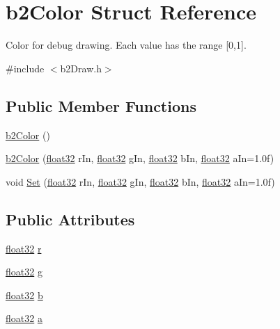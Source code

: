 \hypertarget{structb2_color}{}\section{b2\+Color Struct Reference}
\label{structb2_color}


Color for debug drawing. Each value has the range \mbox{[}0,1\mbox{]}.  




{\ttfamily \#include $<$b2\+Draw.\+h$>$}

\subsection*{Public Member Functions}
\begin{DoxyCompactItemize}
\item 
\mbox{\hyperlink{structb2_color_aab8716defcdf745729d1164cd8b08437}{b2\+Color}} ()
\item 
\mbox{\hyperlink{structb2_color_a7cceec6dae0dccd757f35eacd41595c6}{b2\+Color}} (\mbox{\hyperlink{b2_settings_8h_aacdc525d6f7bddb3ae95d5c311bd06a1}{float32}} r\+In, \mbox{\hyperlink{b2_settings_8h_aacdc525d6f7bddb3ae95d5c311bd06a1}{float32}} g\+In, \mbox{\hyperlink{b2_settings_8h_aacdc525d6f7bddb3ae95d5c311bd06a1}{float32}} b\+In, \mbox{\hyperlink{b2_settings_8h_aacdc525d6f7bddb3ae95d5c311bd06a1}{float32}} a\+In=1.\+0f)
\item 
void \mbox{\hyperlink{structb2_color_aecd71c7fe34182071a5e4699c4fd5cae}{Set}} (\mbox{\hyperlink{b2_settings_8h_aacdc525d6f7bddb3ae95d5c311bd06a1}{float32}} r\+In, \mbox{\hyperlink{b2_settings_8h_aacdc525d6f7bddb3ae95d5c311bd06a1}{float32}} g\+In, \mbox{\hyperlink{b2_settings_8h_aacdc525d6f7bddb3ae95d5c311bd06a1}{float32}} b\+In, \mbox{\hyperlink{b2_settings_8h_aacdc525d6f7bddb3ae95d5c311bd06a1}{float32}} a\+In=1.\+0f)
\end{DoxyCompactItemize}
\subsection*{Public Attributes}
\begin{DoxyCompactItemize}
\item 
\mbox{\hyperlink{b2_settings_8h_aacdc525d6f7bddb3ae95d5c311bd06a1}{float32}} \mbox{\hyperlink{structb2_color_a9ab6c9a910caee177d96980b74ffb00b}{r}}
\item 
\mbox{\hyperlink{b2_settings_8h_aacdc525d6f7bddb3ae95d5c311bd06a1}{float32}} \mbox{\hyperlink{structb2_color_a241c742352403ec456b51ac5f2abe7d9}{g}}
\item 
\mbox{\hyperlink{b2_settings_8h_aacdc525d6f7bddb3ae95d5c311bd06a1}{float32}} \mbox{\hyperlink{structb2_color_a9e7380d27a63010cfad49b97f66dcd26}{b}}
\item 
\mbox{\hyperlink{b2_settings_8h_aacdc525d6f7bddb3ae95d5c311bd06a1}{float32}} \mbox{\hyperlink{structb2_color_adf752d6bc4b05221be1d964e47cf716d}{a}}
\end{DoxyCompactItemize}


